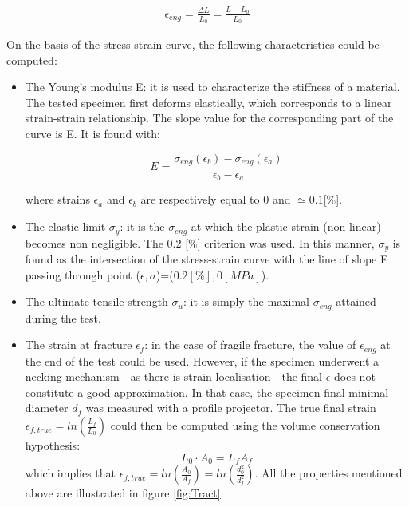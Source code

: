 \begin{align*}
\epsilon_{eng}=\frac{\Delta L}{L_0}=\frac{L-L_0}{L_0}
\end{align*}

On the basis of the stress-strain curve, the following characteristics could be computed:

\begin{itemize}

\item The Young's modulus E: it is used to characterize the stiffness of a material. The tested specimen first deforms elastically, which corresponds to a linear strain-strain relationship. The slope value for the corresponding part of the curve is  E. It is found with:

$$E=\frac{\sigma_{eng}(\epsilon_b)-\sigma_{eng}(\epsilon_a)}{\epsilon_b-\epsilon_a}$$

where strains $\epsilon_a$ and $\epsilon_b$ are respectively equal to 0 and $\simeq 0.1$[\%].

\item The elastic limit $\sigma_y$: it is the $\sigma_{eng}$ at which the plastic strain (non-linear) becomes non negligible. The 0.2 [\%] criterion was used. In this manner, $\sigma_y$ is found as the intersection of the stress-strain curve with the line of slope E passing through point ($\epsilon,\sigma$)=($0.2 [\%],0 [MPa]$).

\item The ultimate tensile strength $\sigma_u$: it is simply the maximal $\sigma_{eng}$ attained during the test.

\item The strain at fracture $\epsilon_{f}$: in the case of fragile fracture, the value of $\epsilon_{eng}$ at the end of the test could be used. However, if the specimen underwent a necking mechanism -  as there is strain localisation - the final $\epsilon$ does not constitute a good approximation. In that case, the specimen final minimal diameter $d_f$ was measured with a profile projector. The true final strain $\epsilon_{f,true}=ln(\frac{L_f}{L_0})$ could then be computed using the volume conservation hypothesis: $$L_0 \cdot A_0 = L_f A_f $$
which implies that $\epsilon_{f,true}=ln(\frac{A_0}{A_f})=ln(\frac{d_0^2}{d_f^2})$. All the properties mentioned above are illustrated in figure \ref{fig:Tract}.


\end{itemize}


